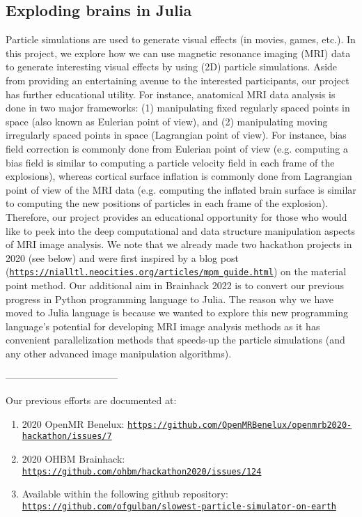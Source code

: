 \documentclass[../main.tex]{subfiles}
\begin{document}
\subsection{Exploding brains in Julia}


Particle simulations are used to generate visual effects (in movies, games, etc.). In this project, we explore how we can use magnetic resonance imaging (MRI) data to generate interesting visual effects by using (2D) particle simulations. Aside from providing an entertaining avenue to the interested participants, our project has further educational utility. For instance, anatomical MRI data analysis is done in two major frameworks: (1) manipulating fixed regularly spaced points in space (also known as Eulerian point of view), and (2) manipulating moving irregularly spaced points in space (Lagrangian point of view). For instance, bias field correction is commonly done from Eulerian point of view (e.g. computing a bias field is similar to computing a particle velocity field in each frame of the explosions), whereas cortical surface inflation is commonly done from Lagrangian point of view of the MRI data (e.g. computing the inflated brain surface is similar to computing the new positions of particles in each frame of the explosion). Therefore, our project provides an educational opportunity for those who would like to peek into the deep computational and data structure manipulation aspects of MRI image analysis. We note that we already made two hackathon projects in 2020 (see below) and were first inspired by a blog post (\texttt{\url{https://nialltl.neocities.org/articles/mpm_guide.html}}) on the material point method\cite{Jiang1965, Love2006, Stomakhin2013a}. Our additional aim in Brainhack 2022 is to convert our previous progress in Python programming language to Julia. The reason why we have moved to Julia language is because we wanted to explore this new programming language's potential for developing MRI image analysis methods as it has convenient parallelization methods that speeds-up the particle simulations (and any other advanced image manipulation algorithms).

-----------------------------------

Our previous efforts are documented at:
\begin{enumerate}
    \item 2020 OpenMR Benelux: \texttt{\url{https://github.com/OpenMRBenelux/openmrb2020-hackathon/issues/7}} 
    \item 2020 OHBM Brainhack: \texttt{\url{https://github.com/ohbm/hackathon2020/issues/124}}
    \item Available within the following github repository: \texttt{\url{https://github.com/ofgulban/slowest-particle-simulator-on-earth}}    
\end{enumerate}
\end{document}
